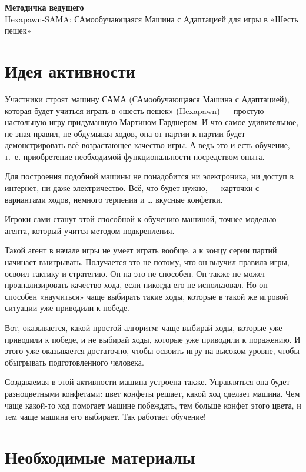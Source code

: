 \documentclass[12pt,a4paper]{article}
\begin{document}
\begin{center}
{\LARGE\bfseries Методичка ведущего}\\[0.5em]
{\large Hexapawn-SAMA: САмообучающаяся Машина с Адаптацией для игры в «Шесть пешек»}
\end{center}


\section*{Идея активности}

Участники строят машину САМА (САмообучающаяся Машина с Адаптацией), которая будет учиться играть в «шесть пешек»
(Hexapawn) --- простую настольную игру придуманную Мартином Гарднером.
И что самое удивительное, не зная правил, не обдумывая ходов, она от партии к партии будет демонстрировать всё
возрастающее качество игры.
А ведь это и есть обучение, т.~е. приобретение необходимой функциональности посредством опыта.

Для построения подобной машины не понадобится ни электроника, ни доступ в интернет, ни даже электричество.
Всё, что будет нужно, --- карточки с вариантами ходов, немного терпения и \ldots{} вкусные конфетки.

Игроки сами станут этой способной к обучению машиной, точнее моделью агента, который учится методом подкрепления.

Такой агент в начале игры не умеет играть вообще, а к концу серии партий начинает выигрывать.
Получается это не потому, что он выучил правила игры, освоил тактику и стратегию.
Он на это не способен.
Он также не может проанализировать качество хода, если никогда его не использовал.
Но он способен «научиться» чаще выбирать такие ходы, которые в такой же игровой ситуации уже приводили к победе.

Вот, оказывается, какой простой алгоритм: чаще выбирай ходы, которые уже приводили к победе, и не выбирай ходы, которые
уже приводили к поражению.
И этого уже оказывается достаточно, чтобы освоить игру на высоком уровне, чтобы обыгрывать подготовленного человека.

Создаваемая в этой активности машина устроена также. Управляться она будет разноцветными конфетами:
цвет конфеты решает, какой ход сделает машина.
Чем чаще какой-то ход помогает машине побеждать, тем больше конфет этого цвета, и тем чаще машина его выбирает.
Так работает обучение!


\section*{Необходимые материалы}
\end{document}
